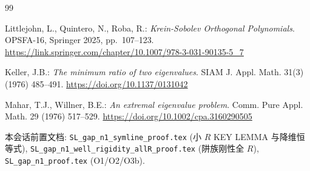 \documentclass[UTF8]{ctexart}
\begin{document}
\begin{thebibliography}{99}
	\item Littlejohn, L., Quintero, N., Roba, R.: \emph{Krein-Sobolev Orthogonal
		Polynomials}. OPSFA-16, Springer 2025, pp.~107--123.
		\url{https://link.springer.com/chapter/10.1007/978-3-031-90135-5_7}
	\item Keller, J.B.: \emph{The minimum ratio of two eigenvalues}.
		SIAM J. Appl. Math. 31(3) (1976) 485--491.
		\url{https://doi.org/10.1137/0131042}
	\item Mahar, T.J., Willner, B.E.: \emph{An extremal eigenvalue problem}.
		Comm. Pure Appl. Math. 29 (1976) 517--529.
		\url{https://doi.org/10.1002/cpa.3160290505}
	\item 本会话前置文档: \texttt{SL\_gap\_n1\_symline\_proof.tex} (小 $R$
		KEY LEMMA 与降维恒等式), \texttt{SL\_gap\_n1\_well\_rigidity\_allR\_proof.tex}
		(阱族刚性全 $R$), \texttt{SL\_gap\_n1\_proof.tex} (O1/O2/O3b).
\end{thebibliography}
\end{document}
